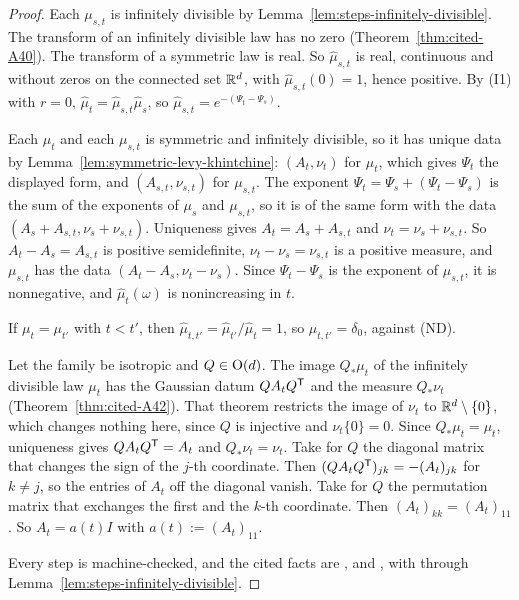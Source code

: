 \begin{proof}
\leanok
{}
Each $\mu_{s,t}$ is infinitely divisible by Lemma~\ref{lem:steps-infinitely-divisible}.
The transform of an infinitely divisible law has no zero (Theorem~\ref{thm:cited-A40}).
The transform of a symmetric law is real. So $\widehat\mu_{s,t}$ is real, continuous and without
zeros on the connected set $\mathbb{R}^d$, with $\widehat\mu_{s,t}(0) = 1$, hence positive. By (I1) with
$r = 0$, $\widehat\mu_t = \widehat\mu_{s,t}\widehat\mu_s$, so
$\widehat\mu_{s,t} = e^{-(\Psi_t - \Psi_s)}$.

Each $\mu_t$ and each $\mu_{s,t}$ is symmetric and infinitely divisible, so it has unique
\Levy{} data by Lemma~\ref{lem:symmetric-levy-khintchine}: $(A_t, \nu_t)$ for $\mu_t$, which gives
$\Psi_t$ the displayed form, and $(A_{s,t}, \nu_{s,t})$ for $\mu_{s,t}$. The exponent
$\Psi_t = \Psi_s + (\Psi_t - \Psi_s)$ is the sum of the exponents of $\mu_s$ and $\mu_{s,t}$, so it
is of the same form with the data $(A_s + A_{s,t}, \nu_s + \nu_{s,t})$. Uniqueness gives
$A_t = A_s + A_{s,t}$ and $\nu_t = \nu_s + \nu_{s,t}$. So $A_t - A_s = A_{s,t}$ is positive semidefinite,
$\nu_t - \nu_s = \nu_{s,t}$ is a positive measure, and $\mu_{s,t}$ has the data
$(A_t - A_s, \nu_t - \nu_s)$. Since $\Psi_t - \Psi_s$ is the exponent of $\mu_{s,t}$, it is
nonnegative, and $\widehat\mu_t(\omega)$ is nonincreasing in $t$.

If $\mu_t = \mu_{t'}$ with $t < t'$, then $\widehat\mu_{t,t'} = \widehat\mu_{t'}/\widehat\mu_t = 1$,
so $\mu_{t,t'} = \delta_0$, against (ND).

Let the family be isotropic and $Q \in \mathrm{O}(d)$. The image $Q_*\mu_t$ of the infinitely divisible
law $\mu_t$ has the Gaussian datum $QA_tQ^{\mathsf{T}}$ and the \Levy{} measure $Q_*\nu_t$
(Theorem~\ref{thm:cited-A42}). That theorem restricts the image of $\nu_t$ to
$\mathbb{R}^d \setminus \{0\}$, which changes nothing here, since $Q$ is injective and $\nu_t\{0\} = 0$.
Since $Q_*\mu_t = \mu_t$, uniqueness gives $QA_tQ^{\mathsf{T}} = A_t$ and $Q_*\nu_t = \nu_t$. Take for $Q$
the diagonal matrix that changes the sign of the $j$-th coordinate. Then
$(QA_tQ^{\mathsf{T}})_{jk} = -(A_t)_{jk}$ for $k \ne j$, so the entries of $A_t$ off the diagonal vanish.
Take for $Q$ the permutation matrix that exchanges the first and the $k$-th coordinate. Then
$(A_t)_{kk} = (A_t)_{11}$. So $A_t = a(t)I$ with $a(t) := (A_t)_{11}$.

Every step is machine-checked, and the cited facts are ,  and
, with  through Lemma~\ref{lem:steps-infinitely-divisible}.
\end{proof}

